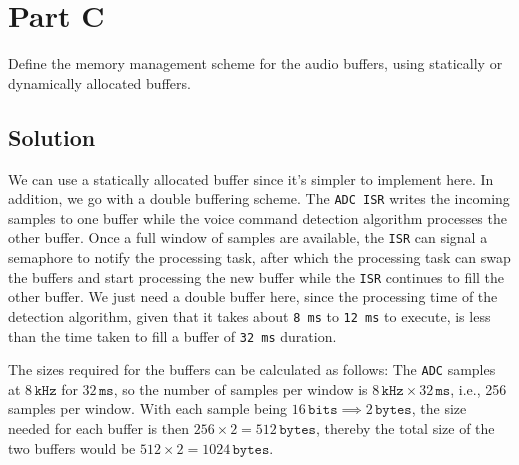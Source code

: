 \section*{Part C}

Define the memory management scheme for the audio buffers, using statically or dynamically allocated buffers.

\subsection*{Solution}

We can use a statically allocated buffer since it's simpler to implement here.
In addition, we go with a double buffering scheme.
The \texttt{ADC ISR} writes the incoming samples to one buffer while the voice command detection algorithm processes the other buffer.
Once a full window of samples are available, the \texttt{ISR} can signal a semaphore to notify the processing task, after which the processing task can swap the buffers and start processing the new buffer while the \texttt{ISR} continues to fill the other buffer.
We just need a double buffer here, since the processing time of the detection algorithm, given that it takes about \texttt{8\,ms} to \texttt{12\,ms} to execute, is less than the time taken to fill a buffer of \texttt{32\,ms} duration.

The sizes required for the buffers can be calculated as follows:
The \texttt{ADC} samples at \( 8\,\texttt{kHz} \) for \( 32\,\texttt{ms} \), so the number of samples per window is \( 8\,\texttt{kHz} \times 32\,\texttt{ms} \), i.e., 256 samples per window.
With each sample being \( 16\,\texttt{bits} \implies 2\,\texttt{bytes} \), the size needed for each buffer is then \( 256 \times 2 = 512\,\texttt{bytes} \), thereby the total size of the two buffers would be \( 512 \times 2 = 1024\,\texttt{bytes} \).
